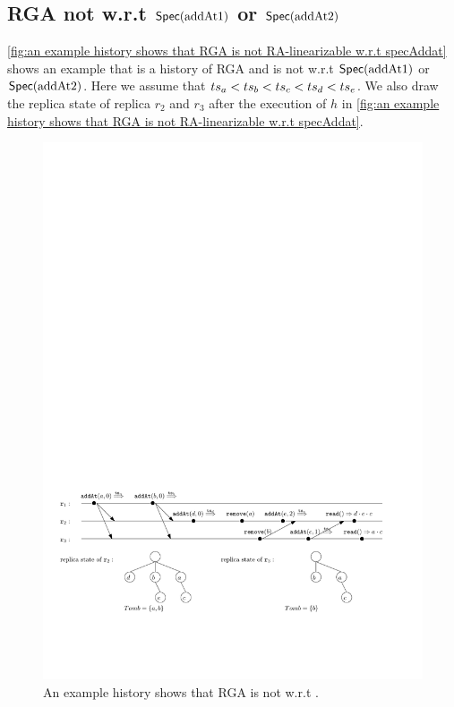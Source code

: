 \subsection{RGA not \crdtlinearizable{} w.r.t $\mathsf{Spec}(\text{addAt1})$ or $\mathsf{Spec}(\text{addAt2})$}
\label{subsec:RGA not RA-linearizable w.r.t specAddatOne or SpecAddatTwo} 

\autoref{fig:an example history shows that RGA is not RA-linearizable w.r.t specAddat} shows an example that is a history of RGA and is not \crdtlinearizable{} w.r.t $\mathsf{Spec}(\text{addAt1})$ or $\mathsf{Spec}(\text{addAt2})$. Here we assume that $ts_a < ts_b < ts_c < ts_d < ts_e$. We also draw the replica state of replica $r_2$ and $r_3$ after the execution of $h$ in \autoref{fig:an example history shows that RGA is not RA-linearizable w.r.t specAddat}. 


\begin{figure}[!h]
  \centering
  \includegraphics[width=0.9 \textwidth]{figures/RGAwithaddAtNotRALin.pdf}
\vspace{-10pt}
  \caption{An example history shows that RGA is not \crdtlinearizable{} w.r.t .}
  \label{fig:an example history shows that RGA is not RA-linearizable w.r.t specAddat}
\end{figure} 

